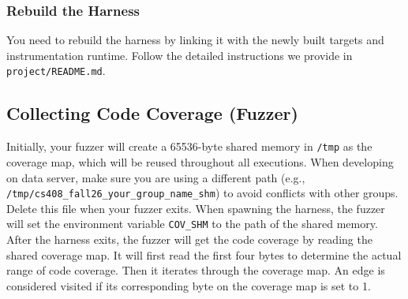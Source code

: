 \documentclass[letterpaper,11pt]{article}
\begin{document}







\subsubsection{Rebuild the Harness}

You need to rebuild the harness by linking it with the newly built targets and instrumentation runtime.
Follow the detailed instructions we provide in \texttt{project/README.md}.

\subsection{Collecting Code Coverage (Fuzzer)}
Initially, your fuzzer will create a 65536-byte shared memory in \texttt{/tmp} as the coverage map, which will be reused throughout all executions.
When developing on data server, make sure you are using a different path (e.g., \texttt{/tmp/cs408_fall26_your\_group\_name_shm}) to avoid conflicts with other groups.
Delete this file when your fuzzer exits.
When spawning the harness, the fuzzer will set the environment variable \texttt{COV_SHM} to the path of the shared memory.
After the harness exits, the fuzzer will get the code coverage by reading the shared coverage map.
It will first read the first four bytes to determine the actual range of code coverage.
Then it iterates through the coverage map.
An edge is considered visited if its corresponding byte on the coverage map is set to 1.
\end{document}
